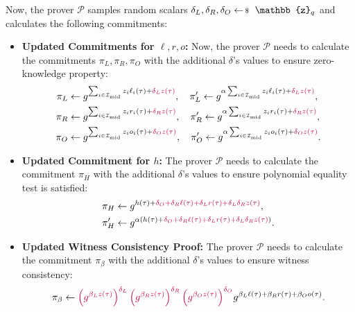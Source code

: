 \documentclass[../lecture-notes-148x210.tex]{subfiles}
\begin{document}
\begin{proposition}
    Now, the prover $\mathcal{P}$ samples random scalars $\delta_L, \delta_R, \delta_O \leftarrowS \mathbb{z}_q$ and calculates the following commitments:
    \begin{itemize}
        \item \textbf{Updated Commitments for $\ell,r,o$:} Now, the prover $\mathcal{P}$ needs to calculate the commitments $\pi_L,\pi_R,\pi_O$ with the additional $\delta$'s values to ensure zero-knowledge property:
        \begin{align*}
            \pi_L &\gets g^{\sum_{i \in \mathcal{I}_{\text{mid}}}z_i\ell_i(\tau) + \textcolor{purple}{\delta_Lz(\tau)}}, \quad \pi_L' \gets g^{\alpha\sum_{i \in \mathcal{I}_{\text{mid}}}z_i\ell_i(\tau) + \textcolor{purple}{\delta_Lz(\tau)}}, \\
            \pi_R &\gets g^{\sum_{i \in \mathcal{I}_{\text{mid}}}z_ir_i(\tau) + \textcolor{purple}{\delta_Rz(\tau)}}, \quad \pi_R' \gets g^{\alpha\sum_{i \in \mathcal{I}_{\text{mid}}}z_ir_i(\tau) + \textcolor{purple}{\delta_Rz(\tau)}}, \\
            \pi_O &\gets g^{\sum_{i \in \mathcal{I}_{\text{mid}}}z_io_i(\tau) + \textcolor{purple}{\delta_Oz(\tau)}}, \quad \pi_O' \gets g^{\alpha\sum_{i \in \mathcal{I}_{\text{mid}}}z_io_i(\tau) + \textcolor{purple}{\delta_Oz(\tau)}}.
        \end{align*}
        \item \textbf{Updated Commitment for $h$:} The prover $\mathcal{P}$ needs to calculate the commitment $\pi_H$ with the additional $\delta$'s values to ensure polynomial equality test is satisfied:
        \begin{equation*}
            \begin{aligned}
                &\pi_H \gets g^{h(\tau) + \textcolor{purple}{\delta_O + \delta_R \ell(\tau) + \delta_L r(\tau) + \delta_L \delta_R z(\tau)}}, \\ 
                &\pi_H' \gets g^{\alpha(h(\tau) + \textcolor{purple}{\delta_O + \delta_R \ell(\tau) + \delta_L r(\tau) + \delta_L \delta_R z(\tau)})}.                
            \end{aligned}
        \end{equation*}
        \item \textbf{Updated Witness Consistency Proof:} The prover $\mathcal{P}$ needs to calculate the commitment $\pi_{\beta}$ with the additional $\delta$'s values to ensure witness consistency:
        \begin{equation*}
            \pi_{\beta} \gets \textcolor{purple}{\left(g^{\beta_L z(\tau)}\right)^{\delta_L}\left(g^{\beta_R z(\tau)}\right)^{\delta_R}\left(g^{\beta_O z(\tau)}\right)^{\delta_O}}g^{\beta_L\ell(\tau) + \beta_Rr(\tau) + \beta_Oo(\tau)}.
        \end{equation*}
    \end{itemize}
\end{proposition}
\end{document}
